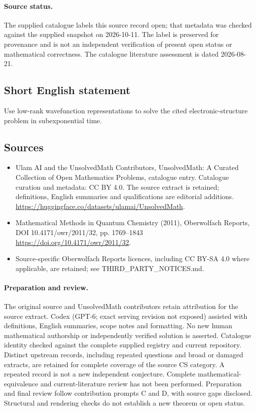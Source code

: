 \documentclass[11pt]{article}
\begin{document}
\paragraph{Source status.}
The supplied catalogue labels this source record open; that metadata was checked against the supplied snapshot on 2026-10-11. The label is preserved for provenance and is not an independent verification of present open status or mathematical correctness. The catalogue literature assessment is dated 2026-08-21.
\subsection{Short English statement}
Use low-rank wavefunction representations to solve the cited electronic-structure problem in subexponential time.
\subsection{Sources}
\begin{itemize}
\item[S1] Ulam AI and the UnsolvedMath Contributors, UnsolvedMath: A Curated Collection of Open Mathematics Problems, catalogue entry. Catalogue curation and metadata: CC BY 4.0. The source extract is retained; definitions, English summaries and qualifications are editorial additions.
\url{https://huggingface.co/datasets/ulamai/UnsolvedMath}.
\item[S2] Mathematical Methods in Quantum Chemistry (2011), Oberwolfach Reports, DOI 10.4171/owr/2011/32, pp. 1769--1843
\url{https://doi.org/10.4171/owr/2011/32}.
\item Source-specific Oberwolfach Reports licences, including CC BY-SA 4.0 where applicable, are retained; see THIRD\_PARTY\_NOTICES.md.
\end{itemize}
\paragraph{Preparation and review.}
The original source and UnsolvedMath contributors retain attribution for the source extract. Codex (GPT-6; exact serving revision not exposed) assisted with definitions, English summaries, scope notes and formatting. No new human mathematical authorship or independently verified solution is asserted. Catalogue identity checked against the complete supplied registry and current repository. Distinct upstream records, including repeated questions and broad or damaged extracts, are retained for complete coverage of the source CS category. A repeated record is not a new independent conjecture. Complete mathematical-equivalence and current-literature review has not been performed. Preparation and final review follow contribution prompts C and D, with source gaps disclosed. Structural and rendering checks do not establish a new theorem or open status.
\label{end:statement}
\end{document}

